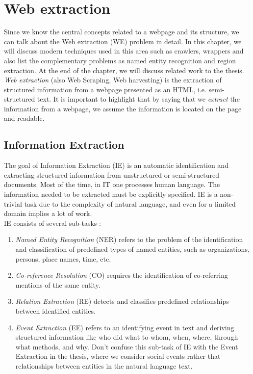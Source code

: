 \chapter{Web extraction}
\label{chap:webextr}
Since we know the central concepts related to a webpage and its structure, we can talk about the Web extraction (WE) problem in detail. In this chapter, we will discuss modern techniques used in this area such as crawlers, wrappers and also list the complementary problems as named entity recognition and region extraction. At the end of the chapter, we will discuss related work to the thesis.\\

\textit{Web extraction} (also Web Scraping, Web harvesting) is the extraction of structured information from a webpage presented as an HTML, i.e. semi-structured text. It is important to highlight that by saying that we \textit{extract} the information from a webpage, we assume the information is located on the page and readable.


\section{Information Extraction}

The goal of Information Extraction (IE) is an automatic identification and extracting structured information from unstructured or semi-structured documents. Most of the time, in IT one processes human language. The information needed to be extracted must be explicitly specified. IE is a non-trivial task due to the complexity of natural language, and even for a limited domain implies a lot of work.\\

IE consists of several sub-tasks \cite{InfExtr}:

\begin{enumerate}
    \item \textit{Named Entity Recognition} (NER) refers to the problem of the identification and classification of predefined types of named entities, such as organizations, persons, place names, time, etc.
    \item \textit{Co-reference Resolution} (CO) requires the identification of co-referring mentions of the same entity.
    \item \textit{Relation Extraction} (RE) detects and classifies predefined relationships between identified entities.
    \item \textit{Event Extraction} (EE) refers to an identifying event in text and deriving structured information like who did what to whom, when, where, through what methods, and why. Don't confuse this sub-task of IE with the Event Extraction in the thesis, where we consider social events rather that relationships between entities in the natural language text. 
\end{enumerate}

